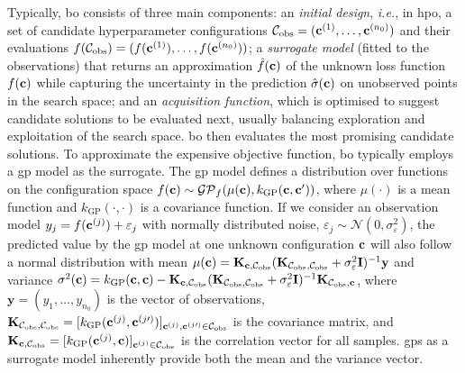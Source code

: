 Typically, \gls{bo} consists of three main components: an \emph{initial design}, \emph{i.e.}, in \gls{hpo}, a set of candidate hyperparameter configurations $\mathcal C_{\mathrm{obs}} = (\mathbf{c}^{(1)},\ldots, \mathbf{c}^{(n_0)})$ and their evaluations
$f(\mathcal C_{\mathrm{obs}}) = (f(\mathbf{c}^{(1)}),\ldots, f(\mathbf{c}^{(n_0)}))$; a \emph{surrogate model} (fitted to the
observations) that returns an approximation $\hat{f}(\mathbf{c})$ of the unknown loss function $f(\mathbf{c})$ while capturing the uncertainty in the prediction $\hat{\sigma}(\mathbf{c})$ on unobserved points in the search space; and an \emph{acquisition function}, which is optimised to suggest candidate solutions to be evaluated next, usually balancing exploration and exploitation of the search space.
\gls{bo} then evaluates the most promising candidate solutions.
To approximate the expensive objective function, \gls{bo} typically employs a \Gls{gp} model as the surrogate. The \gls{gp} model defines a distribution over functions on the configuration space $f(\mathbf{c})\sim\mathcal{GP}_f(\mu(\mathbf{c}),k_{\mathrm{GP}}(\mathbf{c},\mathbf{c}'))$, where
$\mu(\cdot)$
is a mean function and
$k_{\mathrm{GP}}(\cdot,\cdot)$
is a covariance function. If we consider an observation model
$y_j = f(\mathbf{c}^{(j)}) + \varepsilon_j$
with normally distributed noise,
$\varepsilon_j\sim\mathcal{N}(0,\sigma^2_\varepsilon)$,
the predicted value by the \gls{gp} model at one unknown configuration
$\mathbf{c}$ will also follow a normal distribution with mean
$\mu(\mathbf{c})=\mathbf K_{\mathbf{c},\mathcal C_{\mathrm{obs}}}(\mathbf K_{\mathcal C_{\mathrm{obs}},\mathcal C_{\mathrm{obs}}}+\sigma^2_\varepsilon \mathbf I)^{-1}\mathbf y$ and variance $\sigma^2(\mathbf{c})=k_{\mathrm{GP}}(\mathbf{c},\mathbf{c})-\mathbf K_{\mathbf{c},\mathcal C_{\mathrm{obs}}}(\mathbf K_{\mathcal C_{\mathrm{obs}},\mathcal C_{\mathrm{obs}}}+\sigma^2_\varepsilon \mathbf I)^{-1} \mathbf K_{\mathcal C_{\mathrm{obs}},\mathbf{c}}$,
where $\mathbf y=(y_1,\ldots,y_{n_0})$ is the vector of observations, $\mathbf K_{\mathcal C_{\mathrm{obs}},\mathcal C_{\mathrm{obs}}}=[k_{\mathrm{GP}}(\mathbf{c}^{(j)},\mathbf{c}^{(j\prime)})]_{\mathbf{c}^{(j)},\mathbf{c}^{(j\prime)}\in\mathcal C_{\mathrm{obs}}}$ is the covariance matrix, and $\mathbf K_{\mathbf{c},\mathcal C_{\mathrm{obs}}}=[k_{\mathrm{GP}}(\mathbf{c}^{(j)},\mathbf{c})]_{\mathbf{c}^{(j)}\in\mathcal C_{\mathrm{obs}}}$ is the correlation vector for all samples.
\glspl{gp} as a surrogate model inherently provide both the mean and the variance vector.


